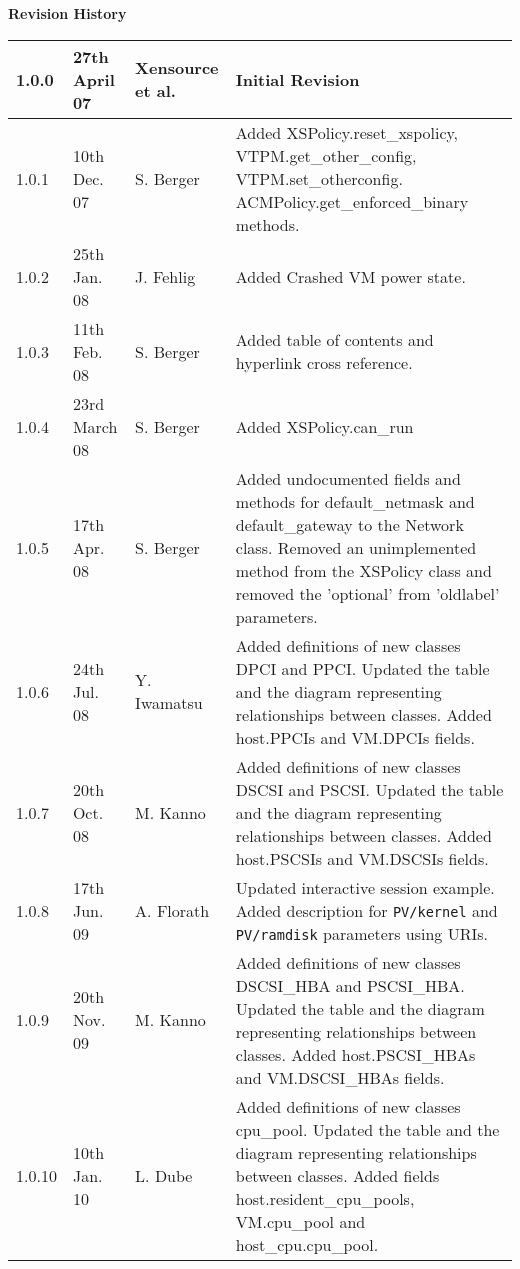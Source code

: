 { \bf Revision History}


\begin{flushleft}
\begin{center}
 \begin{tabular}{|l|l|l|>{\raggedright}p{7cm}|}
  \hline
  1.0.0 & 27th April 07 & Xensource et al. &
     Initial Revision\tabularnewline
  \hline
  1.0.1 & 10th Dec. 07 & S. Berger &
     Added XSPolicy.reset\_xspolicy, VTPM.get\_other\_config,
     VTPM.set\_otherconfig. ACMPolicy.get\_enforced\_binary methods.\tabularnewline
  \hline
  1.0.2 & 25th Jan. 08 & J. Fehlig &
     Added Crashed VM power state.\tabularnewline
  \hline
  1.0.3 & 11th Feb. 08 & S. Berger &
     Added table of contents and hyperlink cross reference.\tabularnewline
  \hline
  1.0.4 & 23rd March 08 & S. Berger &
     Added XSPolicy.can\_run\tabularnewline
  \hline
  1.0.5 & 17th Apr. 08 & S. Berger &
     Added undocumented fields and methods for default\_netmask and
     default\_gateway to the Network class. Removed an unimplemented
     method from the XSPolicy class and removed the 'optional' from
     'oldlabel' parameters.\tabularnewline
  \hline
  1.0.6 & 24th Jul. 08 & Y. Iwamatsu &
     Added definitions of new classes DPCI and PPCI. Updated the table
     and the diagram representing relationships between classes.
     Added host.PPCIs and VM.DPCIs fields.\tabularnewline
  \hline
  1.0.7 & 20th Oct. 08 & M. Kanno &
     Added definitions of new classes DSCSI and PSCSI. Updated the table
     and the diagram representing relationships between classes.
     Added host.PSCSIs and VM.DSCSIs fields.\tabularnewline
  \hline
  1.0.8 & 17th Jun. 09 & A. Florath &
     Updated interactive session example.
     Added description for \texttt{PV/kernel} and \texttt{PV/ramdisk}
     parameters using URIs.\tabularnewline
  \hline
  1.0.9 & 20th Nov. 09 & M. Kanno &
     Added definitions of new classes DSCSI\_HBA and PSCSI\_HBA.
     Updated the table and the diagram representing relationships
     between classes. Added host.PSCSI\_HBAs and VM.DSCSI\_HBAs
     fields.\tabularnewline
  \hline
  1.0.10 & 10th Jan. 10 & L. Dube &
     Added definitions of new classes cpu\_pool. Updated the table
     and the diagram representing relationships between classes.
     Added fields host.resident\_cpu\_pools, VM.cpu\_pool and
     host\_cpu.cpu\_pool.\tabularnewline
  \hline
 \end{tabular}
\end{center}
\end{flushleft}
